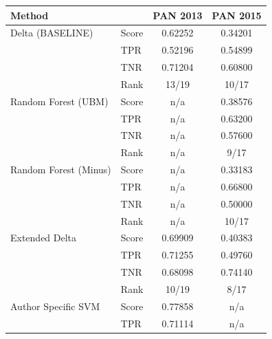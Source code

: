 \begin{table}
    \centering
    \begin{tabular}{ll|cc}
        \textbf{Method}           &           & \textbf{PAN 2013} & \textbf{PAN 2015} \\ \hline
        Delta (BASELINE)          & Score     & 0.62252           & 0.34201           \\
                                  & \gls{TPR} & 0.52196           & 0.54899           \\
                                  & \gls{TNR} & 0.71204           & 0.60800           \\
                                  & Rank      & 13/19             & 10/17             \\ \hline
        Random Forest (\gls{UBM}) & Score     & n/a               & 0.38576           \\
                                  & \gls{TPR} & n/a               & 0.63200           \\
                                  & \gls{TNR} & n/a               & 0.57600           \\
                                  & Rank      & n/a               & 9/17              \\ \hline
        Random Forest (Minus)     & Score     & n/a               & 0.33183           \\
                                  & \gls{TPR} & n/a               & 0.66800           \\
                                  & \gls{TNR} & n/a               & 0.50000           \\
                                  & Rank      & n/a               & 10/17             \\ \hline
        Extended Delta            & Score     & 0.69909           & 0.40383           \\
                                  & \gls{TPR} & 0.71255           & 0.49760           \\
                                  & \gls{TNR} & 0.68098           & 0.74140           \\
                                  & Rank      & 10/19             & 8/17              \\ \hline
        Author Specific SVM       & Score     & 0.77858           & n/a               \\
                                  & \gls{TPR} & 0.71114           & n/a               \\

\end{tabular}
\end{table}
